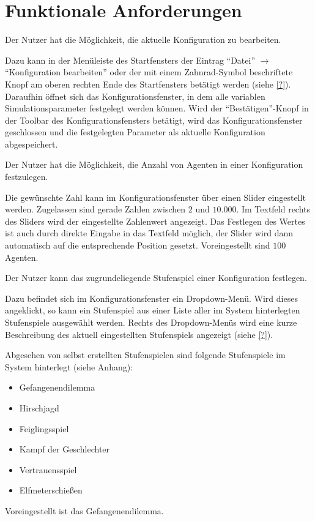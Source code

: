 \documentclass[parskip=full,11pt]{scrartcl}
\begin{document}
\section{Funktionale Anforderungen}

Der Nutzer hat die Möglichkeit, die aktuelle Konfiguration zu bearbeiten.

Dazu kann in der Menüleiste des Startfensters der Eintrag \enquote{Datei} \(\rightarrow\) \enquote{Konfiguration bearbeiten} oder der mit einem Zahnrad-Symbol beschriftete Knopf am oberen rechten Ende des Startfensters betätigt werden (siehe \cref{?}). Daraufhin öffnet sich das Konfigurationsfenster, in dem alle variablen Simulationsparameter festgelegt werden können. Wird der \enquote{Bestätigen}-Knopf in der Toolbar des Konfigurationsfensters betätigt, wird das Konfigurationsfenster geschlossen und die festgelegten Parameter als aktuelle Konfiguration abgespeichert.

Der Nutzer hat die Möglichkeit, die Anzahl von Agenten in einer Konfiguration festzulegen.

Die gewünschte Zahl kann im Konfigurationsfenster über einen Slider eingestellt werden. Zugelassen sind gerade Zahlen zwischen \(2\) und \(10.000\). Im Textfeld rechts des Sliders wird der eingestellte Zahlenwert angezeigt. Das Festlegen des Wertes ist auch durch direkte Eingabe in das Textfeld möglich, der Slider wird dann automatisch auf die entsprechende Position gesetzt. Voreingestellt sind \(100\) Agenten.

Der Nutzer kann das zugrundeliegende Stufenspiel einer Konfiguration festlegen.

Dazu befindet sich im Konfigurationsfenster ein Dropdown-Menü. Wird dieses angeklickt, so kann ein Stufenspiel aus einer Liste aller im System hinterlegten Stufenspiele ausgewählt werden. Rechts des Dropdown-Menüs wird eine kurze Beschreibung des aktuell eingestellten Stufenspiels angezeigt (siehe \cref{?}).

Abgesehen von selbst erstellten Stufenspielen sind folgende Stufenspiele im System hinterlegt (siehe Anhang):
\begin{itemize} \itemsep -10pt
\item Gefangenendilemma
\item Hirschjagd
\item Feiglingsspiel
\item Kampf der Geschlechter
\item Vertrauensspiel
\item Elfmeterschießen
\end{itemize}
Voreingestellt ist das Gefangenendilemma.
\end{document}
